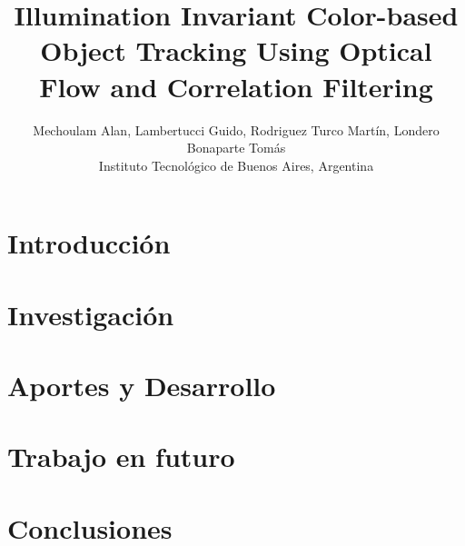 

\usepackage[procnames]{listings}








\title{Illumination Invariant Color-based Object Tracking Using Optical Flow and Correlation Filtering}
\author{Mechoulam Alan, Lambertucci Guido, Rodriguez Turco Martín, Londero Bonaparte Tomás\\
\small{Instituto Tecnológico de Buenos Aires, Argentina}}
\maketitle

\begin{abstract}

\end{abstract}


\section{Introducción}

	
\section{Investigación}


\section{Aportes y Desarrollo}


\section{Trabajo en futuro}


\section{Conclusiones}


